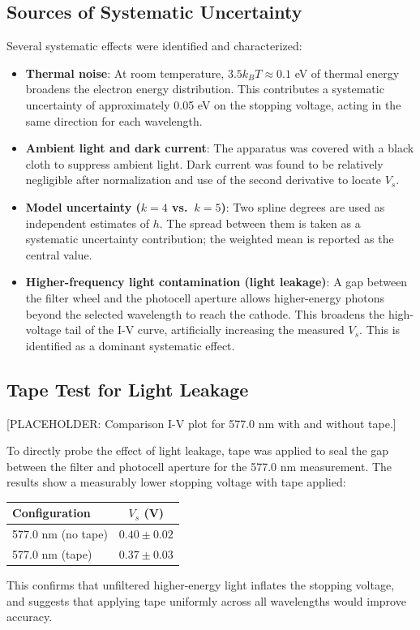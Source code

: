 \documentclass[12pt]{article}
\begin{document}
\subsection{Sources of Systematic Uncertainty}

Several systematic effects were identified and characterized:

\begin{itemize}
    \item \textbf{Thermal noise}: At room temperature, $3.5 k_B T \approx 0.1$ eV of thermal energy broadens the electron energy distribution. This contributes a systematic uncertainty of approximately 0.05 eV on the stopping voltage, acting in the same direction for each wavelength.

    \item \textbf{Ambient light and dark current}: The apparatus was covered with a black cloth to suppress ambient light. Dark current was found to be relatively negligible after normalization and use of the second derivative to locate $V_s$.

    \item \textbf{Model uncertainty ($k = 4$ vs.\ $k = 5$)}: Two spline degrees are used as independent estimates of $h$. The spread between them is taken as a systematic uncertainty contribution; the weighted mean is reported as the central value.

    \item \textbf{Higher-frequency light contamination (light leakage)}: A gap between the filter wheel and the photocell aperture allows higher-energy photons beyond the selected wavelength to reach the cathode. This broadens the high-voltage tail of the I-V curve, artificially increasing the measured $V_s$. This is identified as a dominant systematic effect.
\end{itemize}

\subsection{Tape Test for Light Leakage}

[PLACEHOLDER: Comparison I-V plot for 577.0 nm with and without tape.]

To directly probe the effect of light leakage, tape was applied to seal the gap between the filter and photocell aperture for the 577.0 nm measurement. The results show a measurably lower stopping voltage with tape applied:
\begin{center}
\begin{tabular}{lc}
\toprule
Configuration & $V_s$ (V) \\
\midrule
577.0 nm (no tape) & $0.40 \pm 0.02$ \\
577.0 nm (tape)    & $0.37 \pm 0.03$ \\
\bottomrule
\end{tabular}
\end{center}
This confirms that unfiltered higher-energy light inflates the stopping voltage, and suggests that applying tape uniformly across all wavelengths would improve accuracy.
\end{document}
